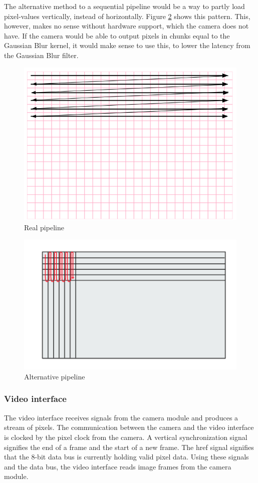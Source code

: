 The alternative method to a sequential pipeline would be a way to partly load pixel-values vertically, instead of horizontally. Figure \ref{fig:Alt_Pipe} shows this pattern. This, however, makes no sense without hardware support, which the camera does not have. If the camera would be able to output pixels in chunks equal to the Gaussian Blur kernel, it would make sense to use this, to lower the latency from the Gaussian Blur filter.
\begin{figure}
    \centering
    \includegraphics[scale=0.4]{Images/real_pipeline.png}
    \caption{Real pipeline}
    \label{fig:Real_Pipe}
\end{figure}

\begin{figure}
    \centering
    \includegraphics[scale=0.75]{Images/alternative_pipline.png}
    \caption{Alternative pipeline}
    \label{fig:Alt_Pipe}
\end{figure}

\subsubsection{Video interface}
The video interface receives signals from the camera module and produces a stream of pixels. The communication between the camera and the video interface is clocked by the pixel clock from the camera. A vertical synchronization 
signal signifies the end of a frame and the start of a new frame. The href signal signifies that the 8-bit data bus is currently holding valid pixel data. Using these signals and the data bus, the video interface reads image frames from the camera module.

